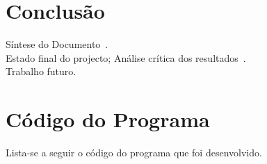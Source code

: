 \documentclass{report}
\begin{document}
\chapter{Conclusão} \label{concl}
Síntese do Documento~.\\
Estado final do projecto; Análise crítica dos resultados~.\\
Trabalho futuro.

\appendix
\chapter{Código do Programa}

Lista-se a seguir o código  do programa  que foi desenvolvido.




\end{document}
